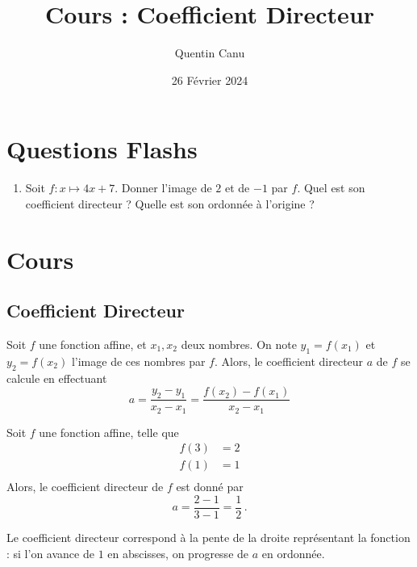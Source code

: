 \documentclass{article}
\author{Quentin Canu}
\title{Cours : Coefficient Directeur}
\date{26 Février 2024}
\begin{document}
\maketitle
\section{Questions Flashs}
\begin{enumerate}
\item Soit $f : x \mapsto 4x + 7$. Donner l'image de $2$ et de $-1$ par $f$. Quel est son coefficient directeur ? Quelle est son ordonnée à l'origine ?
\end{enumerate}
\section{Cours}
\subsection*{Coefficient Directeur}
\begin{proposition}
Soit $f$ une fonction affine, et $x_1,x_2$ deux nombres. On note $y_1 = f(x_1)$ et $y_2 = f(x_2)$ l'image de ces nombres par $f$. Alors, le coefficient directeur $a$ de $f$ se calcule en effectuant
\begin{equation*}
a = \dfrac{y_2 - y_1}{x_2 - x_1} = \dfrac{f(x_2) - f(x_1)}{x_2 - x_1}
\end{equation*}
\end{proposition}
\begin{example}
Soit $f$ une fonction affine, telle que
\begin{equation*}
\begin{aligned}
f(3) &= 2\\
f(1) &= 1\\
\end{aligned}    
\end{equation*}
Alors, le coefficient directeur de $f$ est donné par
\begin{equation*}
a = \dfrac{2 - 1}{3 - 1} = \dfrac{1}{2}\,.
\end{equation*}
\end{example}
\begin{center}
\end{center}
Le coefficient directeur correspond à la pente de la droite représentant la fonction : si l'on avance de $1$ en abscisses, on progresse de $a$ en ordonnée.
\end{document}

